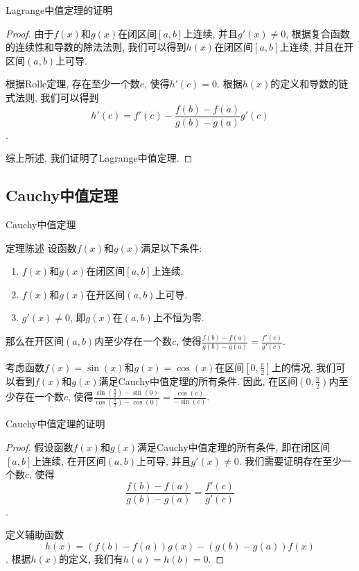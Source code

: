 \documentclass[
10pt,
aspectratio=43,
]{beamer}
\begin{document}
  \begin{frame}{Lagrange中值定理的证明}
	\begin{proof}

  由于$f(x)$和$g(x)$在闭区间$[a, b]$上连续, 并且$g'(x) \neq 0$, 根据复合函数的连续性和导数的除法法则, 我们可以得到$h(x)$在闭区间$[a, b]$上连续, 并且在开区间$(a, b)$上可导. 

  \pause
	  根据Rolle定理, 存在至少一个数$c$, 使得$h'(c) = 0$. 根据$h(x)$的定义和导数的链式法则, 我们可以得到$$h'(c) = f'(c) - \frac{f(b) - f(a)}{g(b) - g(a)}g'(c)$$. 
  
	  综上所述, 我们证明了Lagrange中值定理. 
	\end{proof}
  \end{frame}

  \subsection{Cauchy中值定理}
  \begin{frame}{Cauchy中值定理}
	\begin{block}{定理陈述}
	  设函数$f(x)$和$g(x)$满足以下条件: 
	  \begin{enumerate}
		\item $f(x)$和$g(x)$在闭区间$[a, b]$上连续. 
		\item $f(x)$和$g(x)$在开区间$(a, b)$上可导. 
		\item $g'(x) \neq 0$, 即$g(x)$在$(a, b)$上不恒为零. 
	  \end{enumerate}
	  那么在开区间$(a, b)$内至少存在一个数$c$, 使得$\frac{f(b) - f(a)}{g(b) - g(a)} = \frac{f'(c)}{g'(c)}$. 
	\end{block}
  
	\pause
  
	\begin{example}
	  考虑函数$f(x) = \sin(x)$和$g(x) = \cos(x)$在区间$[0, \frac{\pi}{2}]$上的情况. 我们可以看到$f(x)$和$g(x)$满足Cauchy中值定理的所有条件. 因此, 在区间$(0, \frac{\pi}{2})$内至少存在一个数$c$, 使得$\frac{\sin(\frac{\pi}{2}) - \sin(0)}{\cos(\frac{\pi}{2}) - \cos(0)} = \frac{\cos(c)}{-\sin(c)}$. 
	\end{example}
  \end{frame}

  \begin{frame}{Cauchy中值定理的证明}
	\begin{proof}
	  假设函数$f(x)$和$g(x)$满足Cauchy中值定理的所有条件, 即在闭区间$[a, b]$上连续, 在开区间$(a, b)$上可导, 并且$g'(x) \neq 0$. 我们需要证明存在至少一个数$c$, 使得
	  $$\frac{f(b) - f(a)}{g(b) - g(a)} = \frac{f'(c)}{g'(c)}$$. 
  
	  定义辅助函数
	  $$h(x) = (f(b) - f(a))g(x) - (g(b) - g(a))f(x)$$.
	  根据$h(x)$的定义, 我们有$h(a) = h(b) = 0$. 
	\end{proof}
\end{frame}  
\end{document}

